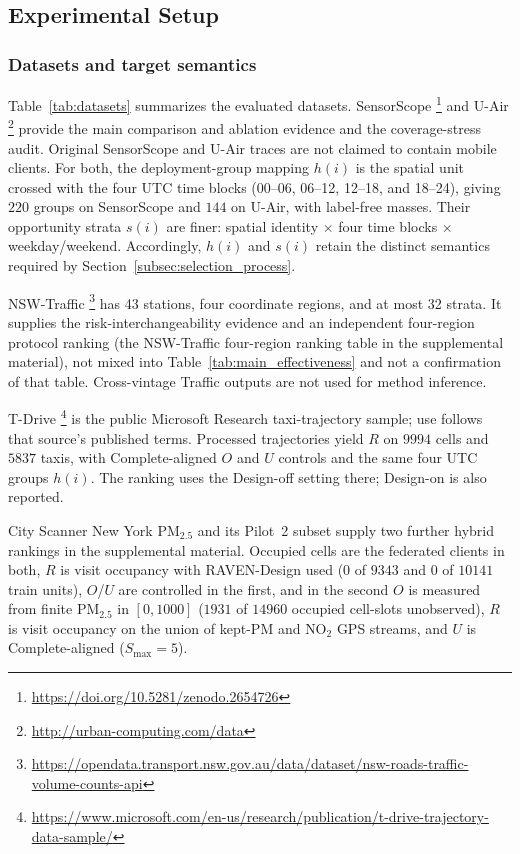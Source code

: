 \documentclass[letterpaper,journal]{IEEEtran}
\begin{document}
\subsection{Experimental Setup}
\label{subsec:eval_setup}

\subsubsection{Datasets and target semantics}

Table~\ref{tab:datasets} summarizes the evaluated datasets.  SensorScope
\cite{ingelrest2010sensorscope,barrenetxea2019sensorscope}\footnote{\url{https://doi.org/10.5281/zenodo.2654726}}
and U-Air
\cite{zheng2013uair}\footnote{\url{http://urban-computing.com/data}}
provide the main comparison and ablation evidence and the coverage-stress audit.
Original SensorScope and U-Air traces are not claimed to contain mobile
clients.  For both, the deployment-group mapping $h(i)$ is the spatial unit
crossed with the four UTC time blocks (00--06, 06--12, 12--18, and 18--24),
giving $220$ groups on SensorScope and $144$ on U-Air, with label-free
masses.  Their opportunity strata $s(i)$ are finer: spatial identity
$\times$ four time blocks $\times$ weekday/weekend.
Accordingly, $h(i)$ and $s(i)$ retain the distinct semantics required by
Section~\ref{subsec:selection_process}.

NSW-Traffic
\cite{tfnsw2024traffic}\footnote{\url{https://opendata.transport.nsw.gov.au/data/dataset/nsw-roads-traffic-volume-counts-api}}
has 43 stations, four coordinate regions, and at most 32 strata.  It
supplies the risk-interchangeability evidence and an independent four-region protocol ranking
(the NSW-Traffic four-region ranking table in the supplemental material), not mixed into
Table~\ref{tab:main_effectiveness} and not a confirmation of that table.  Cross-vintage Traffic outputs are
not used for method inference.

T-Drive
\cite{yuan2010tdrive}\footnote{\url{https://www.microsoft.com/en-us/research/publication/t-drive-trajectory-data-sample/}}
is the public Microsoft Research taxi-trajectory sample; use follows that
source's published terms.  Processed trajectories yield $R$ on $9994$
cells and $5837$ taxis, with Complete-aligned $O$ and $U$ controls and
the same four UTC groups $h(i)$.  The ranking uses the Design-off setting
there; Design-on is also reported.

City Scanner New York {PM}$_{2.5}$ and its Pilot~2 subset supply two further
hybrid rankings in the supplemental material.  Occupied cells are the
federated clients in both, $R$ is visit occupancy with RAVEN-Design used ($0$
of $9343$ and $0$ of $10141$ train units), $O$/$U$ are controlled in the first,
and in the second $O$ is measured from finite {PM}$_{2.5}$ in $[0,1000]$
($1931$ of $14960$ occupied cell-slots unobserved), $R$ is visit occupancy on
the union of kept-{PM} and {NO}$_2$ GPS streams, and $U$ is Complete-aligned
($S_{\max}=5$).
\end{document}

